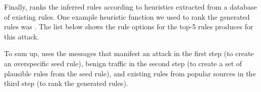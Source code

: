 \documentclass[sigconf,anonymous]{acmart}
\begin{document}
 








Finally, \tname{} ranks the inferred rules according to heuristics
extracted from a database of existing rules. One example heuristic
function we used to rank the generated rules was . The list below shows the rule
options for the top-5 rules \tname{} produces for this attack.


To sum up, \tname{} uses the messages that manifest an attack in the
first step (to create an overspecific seed rule), benign traffic in
the second step (to create a set of plausible rules from the seed
rule), and existing rules from popular sources in the third step (to
rank the generated rules).
\end{document}
